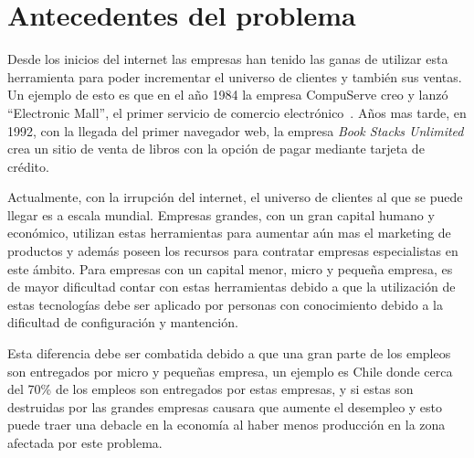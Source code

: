 \section{Antecedentes del problema}

Desde los inicios del internet las empresas han tenido las ganas de utilizar
esta herramienta para poder incrementar el universo de clientes y también sus
ventas.
Un ejemplo de esto es que en el año 1984 la empresa CompuServe creo y lanzó
``Electronic Mall'', el primer servicio de comercio electrónico~\cite{Def:1}.
Años mas tarde, en 1992, con la llegada del primer navegador web, la empresa
\emph{Book Stacks Unlimited} crea un sitio de venta de libros con la opción de
pagar mediante tarjeta de crédito.

Actualmente, con la irrupción del internet, el universo de clientes al que se
puede llegar es a escala mundial.
Empresas grandes, con un gran capital humano y económico, utilizan estas
herramientas para aumentar aún mas el marketing de productos y además poseen los
recursos para contratar empresas especialistas en este ámbito.
Para empresas con un capital menor, micro y pequeña empresa, es de mayor
dificultad contar con estas herramientas debido a que la utilización de estas
tecnologías debe ser aplicado por personas con conocimiento debido a la dificultad
de configuración y mantención.

Esta diferencia debe ser combatida debido a que una gran parte de los empleos
son entregados por micro y pequeñas empresa, un ejemplo es Chile donde cerca del
70\% de los empleos son entregados por estas empresas, y si estas son destruidas
por las grandes empresas causara que aumente el desempleo y esto puede traer una
debacle en la economía al haber menos producción en la zona afectada por este
problema.

